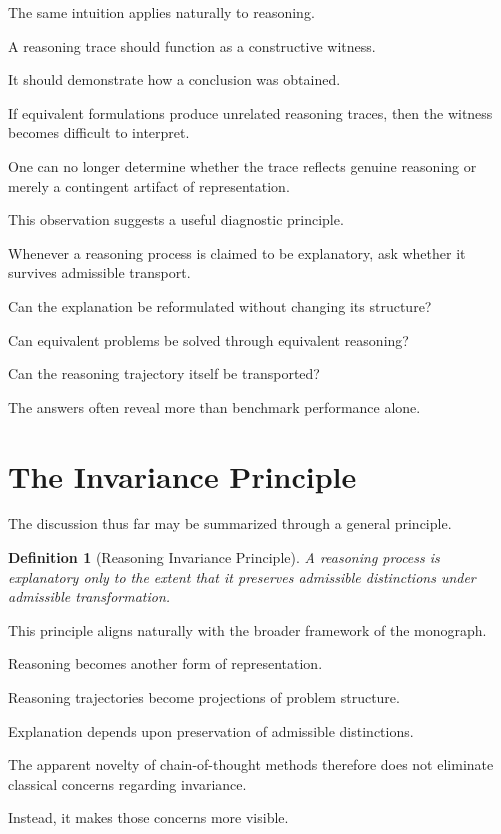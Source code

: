 \documentclass[11pt,oneside,openany]{book}
\newtheorem{definition}{Definition}[chapter] \newtheorem{theorem}{Theorem}[chapter] \newtheorem{proposition}{Proposition}[chapter] \newtheorem{lemma}{Lemma}[chapter] \newtheorem{corollary}{Corollary}[chapter] \newtheorem{remark}{Remark}[chapter]
\begin{document}
The same intuition applies naturally to reasoning.

A reasoning trace should function as a constructive witness.

It should demonstrate how a conclusion was obtained.

If equivalent formulations produce unrelated reasoning traces, then the witness becomes difficult to interpret.

One can no longer determine whether the trace reflects genuine reasoning or merely a contingent artifact of representation.

This observation suggests a useful diagnostic principle.

Whenever a reasoning process is claimed to be explanatory, ask whether it survives admissible transport.

Can the explanation be reformulated without changing its structure?

Can equivalent problems be solved through equivalent reasoning?

Can the reasoning trajectory itself be transported?

The answers often reveal more than benchmark performance alone.

\section{The Invariance Principle}

The discussion thus far may be summarized through a general principle.

\begin{definition}[Reasoning Invariance Principle]

A reasoning process is explanatory only to the extent that it preserves admissible distinctions under admissible transformation.

\end{definition}

This principle aligns naturally with the broader framework of the monograph.

Reasoning becomes another form of representation.

Reasoning trajectories become projections of problem structure.

Explanation depends upon preservation of admissible distinctions.

The apparent novelty of chain-of-thought methods therefore does not eliminate classical concerns regarding invariance.

Instead, it makes those concerns more visible.
\end{document}
